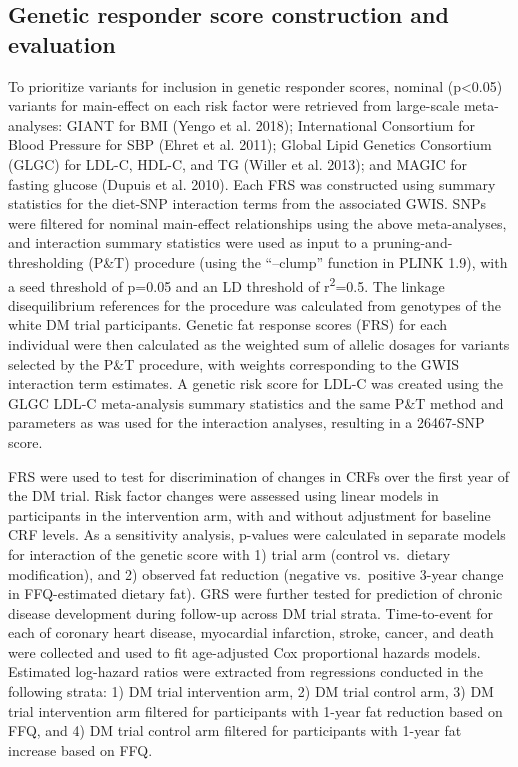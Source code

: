 \documentclass[]{article}
\begin{document}
\hypertarget{genetic-responder-score-construction-and-evaluation}{%
\subsection{Genetic responder score construction and
evaluation}\label{genetic-responder-score-construction-and-evaluation}}

To prioritize variants for inclusion in genetic responder scores,
nominal (p\textless{}0.05) variants for main-effect on each risk factor
were retrieved from large-scale meta-analyses: GIANT for BMI (Yengo et
al. 2018); International Consortium for Blood Pressure for SBP (Ehret et
al. 2011); Global Lipid Genetics Consortium (GLGC) for LDL-C, HDL-C, and
TG (Willer et al. 2013); and MAGIC for fasting glucose (Dupuis et al.
2010). Each FRS was constructed using summary statistics for the
diet-SNP interaction terms from the associated GWIS. SNPs were filtered
for nominal main-effect relationships using the above meta-analyses, and
interaction summary statistics were used as input to a
pruning-and-thresholding (P\&T) procedure (using the ``--clump''
function in PLINK 1.9), with a seed threshold of p=0.05 and an LD
threshold of r\textsuperscript{2}=0.5. The linkage disequilibrium
references for the procedure was calculated from genotypes of the white
DM trial participants. Genetic fat response scores (FRS) for each
individual were then calculated as the weighted sum of allelic dosages
for variants selected by the P\&T procedure, with weights corresponding
to the GWIS interaction term estimates. A genetic risk score for LDL-C
was created using the GLGC LDL-C meta-analysis summary statistics and
the same P\&T method and parameters as was used for the interaction
analyses, resulting in a 26467-SNP score.

FRS were used to test for discrimination of changes in CRFs over the
first year of the DM trial. Risk factor changes were assessed using
linear models in participants in the intervention arm, with and without
adjustment for baseline CRF levels. As a sensitivity analysis, p-values
were calculated in separate models for interaction of the genetic score
with 1) trial arm (control vs.~dietary modification), and 2) observed
fat reduction (negative vs.~positive 3-year change in FFQ-estimated
dietary fat). GRS were further tested for prediction of chronic disease
development during follow-up across DM trial strata. Time-to-event for
each of coronary heart disease, myocardial infarction, stroke, cancer,
and death were collected and used to fit age-adjusted Cox proportional
hazards models. Estimated log-hazard ratios were extracted from
regressions conducted in the following strata: 1) DM trial intervention
arm, 2) DM trial control arm, 3) DM trial intervention arm filtered for
participants with 1-year fat reduction based on FFQ, and 4) DM trial
control arm filtered for participants with 1-year fat increase based on
FFQ.
\end{document}
